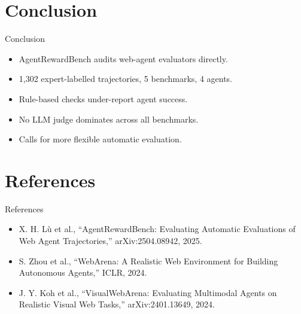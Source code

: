 \documentclass{beamer}
\begin{document}
\section{Conclusion}
\begin{frame}{Conclusion}
\begin{itemize}
\item AgentRewardBench audits web-agent evaluators directly.
\item 1,302 expert-labelled trajectories, 5 benchmarks, 4 agents.
\item Rule-based checks under-report agent success.
\item No LLM judge dominates across all benchmarks.
\item Calls for more flexible automatic evaluation.
\end{itemize}
\end{frame}

\section{References}
\begin{frame}{References}
\footnotesize
\begin{itemize}
\item X. H. L\`u et al., ``AgentRewardBench: Evaluating Automatic Evaluations of Web Agent Trajectories,'' arXiv:2504.08942, 2025.
\item S. Zhou et al., ``WebArena: A Realistic Web Environment for Building Autonomous Agents,'' ICLR, 2024.
\item J. Y. Koh et al., ``VisualWebArena: Evaluating Multimodal Agents on Realistic Visual Web Tasks,'' arXiv:2401.13649, 2024.
\end{itemize}
\end{frame}
\begin{frame}\vfill{}\vfill\end{frame}
\end{document}
